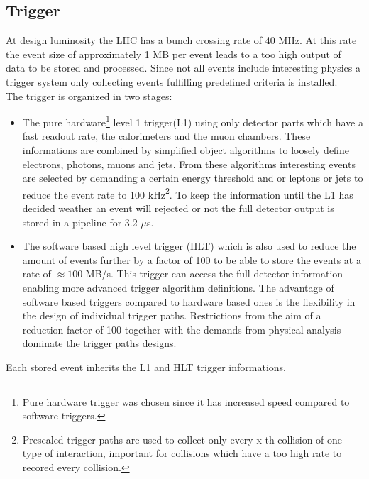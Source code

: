 \subsection{Trigger}
\label{sec:trigger}
At design luminosity the LHC has a bunch crossing rate of 40 MHz. At this rate the event size of approximately  1 MB per event leads to a too high output of data to be stored and processed. Since not all events include interesting physics a trigger system\cite{bib:cmstdr:trigger}\cite{bib:trigger:summerschoollecture} only collecting events fulfilling predefined criteria is installed.\\
The trigger is organized in two stages:
\begin{itemize}
 \item The pure hardware\footnote{Pure hardware trigger was chosen since it has increased speed compared to software triggers.} level 1 trigger(L1) using only detector parts which have a fast readout rate, the calorimeters and the muon chambers. These informations are combined by simplified object algorithms to loosely define electrons, photons, muons and jets. From these algorithms interesting events are selected by demanding a certain energy threshold and or leptons or jets to reduce the event rate to 100 kHz\footnote{Prescaled trigger paths are used to collect only every x-th collision of one type of interaction, important for collisions which have a too high rate to recored every collision.}. To keep the information until the L1 has decided weather an event will rejected or not the full detector output is stored in a pipeline for 3.2 $\mu$s.
 \item The software based high level trigger (HLT) which is also used to reduce the amount of events further by a factor of 100 to be able to store the events at a rate of $\approx 100$ MB/s. This trigger can access the full detector information enabling more advanced trigger algorithm definitions. The advantage of software based triggers compared to hardware based ones is the flexibility in the design of individual trigger paths. Restrictions from the aim of a reduction factor of 100 together with the demands from physical analysis dominate the trigger paths designs. 
\end{itemize}
Each stored event inherits the L1 and HLT trigger informations.
 

